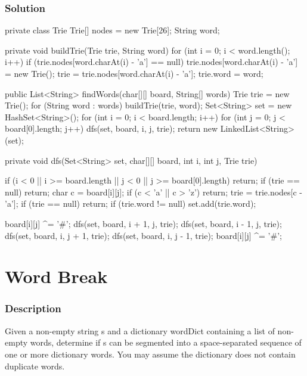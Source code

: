 \subsubsection{Solution}

\begin{Code}
private class Trie {
    Trie[] nodes = new Trie[26];
    String word;
}

private void buildTrie(Trie trie, String word) {
    for (int i = 0; i < word.length(); i++) {
        if (trie.nodes[word.charAt(i) - 'a'] == null) {
            trie.nodes[word.charAt(i) - 'a'] = new Trie();
        }
        trie = trie.nodes[word.charAt(i) - 'a'];
    }
    trie.word = word;
}
\end{Code}

\newpage

\begin{Code}

public List<String> findWords(char[][] board, String[] words) {
    Trie trie = new Trie();
    for (String word : words) {
        buildTrie(trie, word);
    }
    Set<String> set = new HashSet<String>();
    for (int i = 0; i < board.length; i++) {
        for (int j = 0; j < board[0].length; j++) {
            dfs(set, board, i, j, trie);
        }
    }
    return new LinkedList<String>(set);
}

private void dfs(Set<String> set, char[][] board, int i, int j, Trie trie) {
    if (i < 0 || i >= board.length || j < 0 || j >= board[0].length) {
        return;
    }
    if (trie == null) {
        return;
    }
    char c = board[i][j];
    if (c < 'a' || c > 'z') {
        return;
    }
    trie = trie.nodes[c - 'a'];
    if (trie == null) {
        return;
    }
    if (trie.word != null) {
        set.add(trie.word);
    }

    board[i][j] ^= '#';
    dfs(set, board, i + 1, j, trie);
    dfs(set, board, i - 1, j, trie);
    dfs(set, board, i, j + 1, trie);
    dfs(set, board, i, j - 1, trie);
    board[i][j] ^= '#';
}
\end{Code}

\newpage

\section{Word Break} %

\subsubsection{Description}
Given a non-empty string s and a dictionary wordDict containing a list of non-empty words, determine if s can be segmented into a space-separated sequence of one or more dictionary words. You may assume the dictionary does not contain duplicate words.

